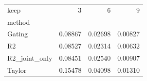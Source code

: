 \begin{tabular}{lrrr}
\toprule
keep & 3 & 6 & 9 \\
method &  &  &  \\
\midrule
Gating & 0.08867 & 0.02698 & 0.00827 \\
R2 & 0.08527 & 0.02314 & 0.00632 \\
R2_joint_only & 0.08451 & 0.02540 & 0.00907 \\
Taylor & 0.15478 & 0.04098 & 0.01310 \\
\bottomrule
\end{tabular}
